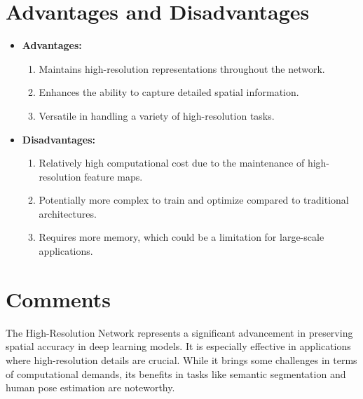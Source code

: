 \section{Advantages and Disadvantages}
\begin{itemize}
    \item \textbf{Advantages:}
    \begin{enumerate}
        \item Maintains high-resolution representations throughout the network.
        \item Enhances the ability to capture detailed spatial information.
        \item Versatile in handling a variety of high-resolution tasks.
    \end{enumerate}
    \item \textbf{Disadvantages:}
    \begin{enumerate}
        \item Relatively high computational cost due to the maintenance of high-resolution feature maps.
        \item Potentially more complex to train and optimize compared to traditional architectures.
        \item Requires more memory, which could be a limitation for large-scale applications.
    \end{enumerate}
\end{itemize}

\section{Comments}
The High-Resolution Network represents a significant advancement in preserving spatial accuracy in deep learning models. It is especially effective in applications where high-resolution details are crucial. While it brings some challenges in terms of computational demands, its benefits in tasks like semantic segmentation and human pose estimation are noteworthy.

